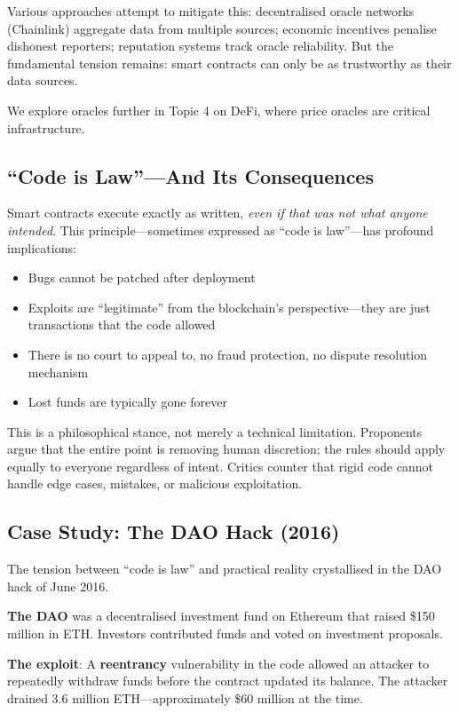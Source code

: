 \documentclass[11pt,a4paper]{article}
\newcommand{\keyword}[1]{\textbf{\textcolor{AccentOrange}{#1}}}
\begin{document}
Various approaches attempt to mitigate this: decentralised oracle networks (Chainlink) aggregate data from multiple sources; economic incentives penalise dishonest reporters; reputation systems track oracle reliability. But the fundamental tension remains: smart contracts can only be as trustworthy as their data sources.

We explore oracles further in Topic 4 on DeFi, where price oracles are critical infrastructure.

\subsection{``Code is Law''---And Its Consequences}

Smart contracts execute exactly as written, \textit{even if that was not what anyone intended}. This principle---sometimes expressed as ``code is law''---has profound implications:

\begin{itemize}
    \item Bugs cannot be patched after deployment
    \item Exploits are ``legitimate'' from the blockchain's perspective---they are just transactions that the code allowed
    \item There is no court to appeal to, no fraud protection, no dispute resolution mechanism
    \item Lost funds are typically gone forever
\end{itemize}

This is a philosophical stance, not merely a technical limitation. Proponents argue that the entire point is removing human discretion; the rules should apply equally to everyone regardless of intent. Critics counter that rigid code cannot handle edge cases, mistakes, or malicious exploitation.

\subsection{Case Study: The DAO Hack (2016)}

The tension between ``code is law'' and practical reality crystallised in the DAO hack of June 2016.

\textbf{The DAO} was a decentralised investment fund on Ethereum that raised \$150 million in ETH. Investors contributed funds and voted on investment proposals.

\textbf{The exploit}: A \keyword{reentrancy} vulnerability in the code allowed an attacker to repeatedly withdraw funds before the contract updated its balance. The attacker drained 3.6 million ETH---approximately \$60 million at the time.
\end{document}
